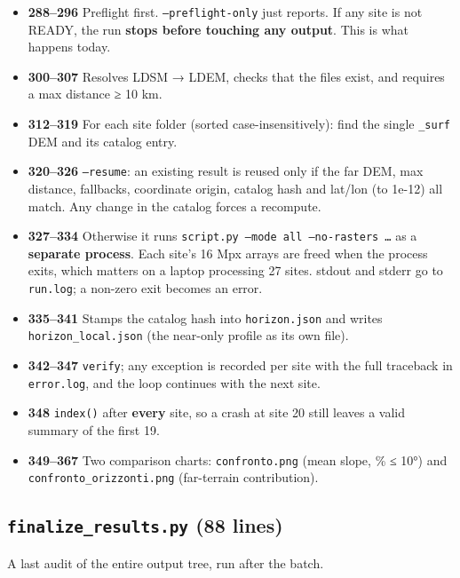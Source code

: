 \documentclass[11pt,a4paper]{article}
\providecommand{\tightlist}{\setlength{\itemsep}{0pt}\setlength{\parskip}{0pt}}
\begin{document}
\begin{itemize}
\tightlist
\item
  \textbf{288--296} Preflight first.
  \texttt{--preflight-only} just reports. If any site
  is not READY, the run \textbf{stops before touching any output}. This
  is what happens today.
\item
  \textbf{300--307} Resolves LDSM → LDEM, checks that the files exist,
  and requires a max distance ≥ 10 km.
\item
  \textbf{312--319} For each site folder (sorted case-insensitively):
  find the single \texttt{\_surf} DEM and its catalog
  entry.
\item
  \textbf{320--326} \texttt{--resume}: an existing
  result is reused only if the far DEM, max distance, fallbacks,
  coordinate origin, catalog hash and lat/lon (to 1e-12) all match. Any
  change in the catalog forces a recompute.
\item
  \textbf{327--334} Otherwise it runs
  \texttt{script.py --mode all --no-rasters …} as a
  \textbf{separate process}. Each site's 16 Mpx arrays are freed when
  the process exits, which matters on a laptop processing 27 sites.
  stdout and stderr go to \texttt{run.log}; a non-zero
  exit becomes an error.
\item
  \textbf{335--341} Stamps the catalog hash into
  \texttt{horizon.json} and writes
  \texttt{horizon\_local.json} (the near-only profile
  as its own file).
\item
  \textbf{342--347} \texttt{verify}; any exception is
  recorded per site with the full traceback in
  \texttt{error.log}, and the loop continues with the
  next site.
\item
  \textbf{348} \texttt{index()} after \textbf{every}
  site, so a crash at site 20 still leaves a valid summary of the first
  19.
\item
  \textbf{349--367} Two comparison charts:
  \texttt{confronto.png} (mean slope, \% ≤ 10°) and
  \texttt{confronto\_orizzonti.png} (far-terrain
  contribution).
\end{itemize}

\hypertarget{finalize_results.py-88-lines}{%
\subsection{\texorpdfstring{\texttt{finalize\_results.py} (88
lines)}{finalize\_results.py (88 lines)}}\label{finalize_results.py-88-lines}}

A last audit of the entire output tree, run after the batch.
\end{document}
